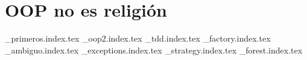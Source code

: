 \part{OOP no es religión}
  {_primeros.index.tex}
  {_oop2.index.tex}
  {_tdd.index.tex}
  {_factory.index.tex}
  {_ambiguo.index.tex}
  {_exceptions.index.tex}
  {_strategy.index.tex}
  {_forest.index.tex}
